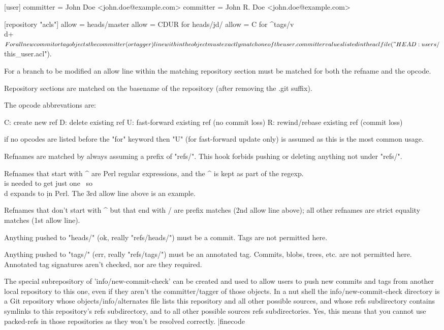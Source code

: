   [user]
    committer = John Doe <john.doe@example.com>
    committer = John R. Doe <john.doe@example.com>

  [repository "acls"]
    allow = heads/master
    allow = CDUR for heads/jd/
    allow = C    for ^tags/v\\d+$

For all new commit or tag objects the committer (or tagger) line
within the object must exactly match one of the user.committer
values listed in the acl file ("HEAD:users/$this_user.acl").

For a branch to be modified an allow line within the matching
repository section must be matched for both the refname and the
opcode.

Repository sections are matched on the basename of the repository
(after removing the .git suffix).

The opcode abbrevations are:

  C: create new ref
  D: delete existing ref
  U: fast-forward existing ref (no commit loss)
  R: rewind/rebase existing ref (commit loss)

if no opcodes are listed before the "for" keyword then "U" (for
fast-forward update only) is assumed as this is the most common
usage.

Refnames are matched by always assuming a prefix of "refs/".
This hook forbids pushing or deleting anything not under "refs/".


Refnames that start with ^ are Perl regular expressions, and the ^
is kept as part of the regexp.  \\ is needed to get just one \, so
\\d expands to \d in Perl.  The 3rd allow line above is an example.

Refnames that don't start with ^ but that end with / are prefix
matches (2nd allow line above); all other refnames are strict
equality matches (1st allow line).

Anything pushed to "heads/" (ok, really "refs/heads/") must be
a commit.  Tags are not permitted here.

Anything pushed to "tags/" (err, really "refs/tags/") must be an
annotated tag.  Commits, blobs, trees, etc. are not permitted here.
Annotated tag signatures aren't checked, nor are they required.

The special subrepository of 'info/new-commit-check' can
be created and used to allow users to push new commits and
tags from another local repository to this one, even if they
aren't the committer/tagger of those objects.  In a nut shell
the info/new-commit-check directory is a Git repository whose
objects/info/alternates file lists this repository and all other
possible sources, and whose refs subdirectory contains symlinks
to this repository's refs subdirectory, and to all other possible
sources refs subdirectories.  Yes, this means that you cannot
use packed-refs in those repositories as they won't be resolved
correctly.
|finecode


